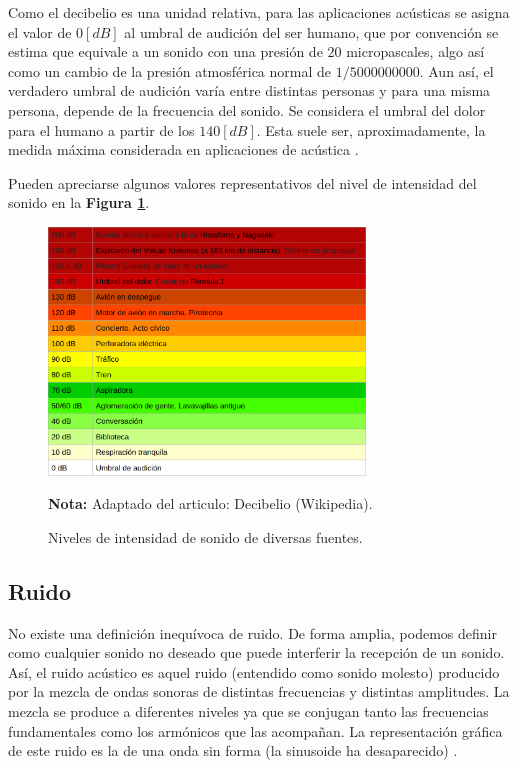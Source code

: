 \documentclass[letter,11pt]{article}
\newcommand{\source}[1]{\vspace{-11pt} \caption*{\small{\textbf{Nota:} {#1}}}}
\begin{document}
Como el decibelio es una unidad relativa, para las aplicaciones acústicas se
asigna el valor de $0 [dB]$ al umbral de audición del ser humano, que por
convención se estima que equivale a un sonido con una presión de $20$
micropascales, algo así como un cambio de la presión atmosférica normal de
$1/5 000 000 000$. Aun así, el verdadero umbral de audición varía entre
distintas personas y para una misma persona, depende de la frecuencia del
sonido. Se considera el umbral del dolor para el humano a partir de los
$140 [dB]$. Esta suele ser, aproximadamente, la medida máxima considerada en
aplicaciones de acústica \cite{WIKI1}.

Pueden apreciarse algunos valores representativos del nivel de intensidad del
sonido en la \textbf{Figura \ref{figura3}}.

\begin{figure}
\centering
\includegraphics[width=0.75\textwidth]{resources/f3.eps}
\caption{Niveles de intensidad de sonido de diversas fuentes.}
\label{figura3}
\source{Adaptado del articulo: Decibelio (Wikipedia).}
\end{figure}

\subsection{Ruido}

No existe una definición inequívoca de ruido. De forma amplia, podemos definir
como cualquier sonido no deseado que puede interferir la recepción de un sonido.
\\

Así, el ruido acústico es aquel ruido (entendido como sonido molesto) producido
por la mezcla de ondas sonoras de distintas frecuencias y distintas amplitudes.
La mezcla se produce a diferentes niveles ya que se conjugan tanto las
frecuencias fundamentales como los armónicos que las acompañan. La
representación gráfica de este ruido es la de una onda sin forma (la sinusoide
ha desaparecido) \cite{WIKI2}.
\\
\end{document}
